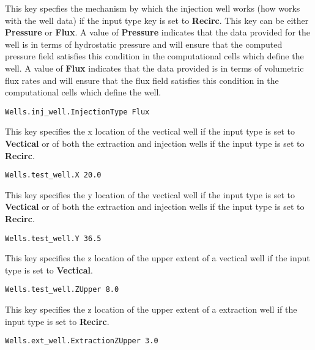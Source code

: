 {
This key specfies the mechanism by which the injection well works (how
\parflow{} works with the well data) if the input type key is set to
{\bf Recirc}.  This key can be either {\bf Pressure} or {\bf Flux}.  A
value of {\bf Pressure} indicates that the data provided for the well is
in terms of hydrostatic pressure and \parflow{} will ensure that the
computed pressure field satisfies this condition in the computational
cells which define the well.  A value of {\bf Flux} indicates that the
data provided is in terms of volumetric flux rates and \parflow{} will
ensure that the flux field satisfies this condition in the computational
cells which define the well.
}
\begin{display}\begin{verbatim}
Wells.inj_well.InjectionType Flux
\end{verbatim}\end{display}

{
This key specifies the x location of the vectical well if the input
type is set to {\bf Vectical} or of both the extraction and injection
wells if the input type is set to {\bf Recirc}.
}
\begin{display}\begin{verbatim}
Wells.test_well.X 20.0
\end{verbatim}\end{display}

{
This key specifies the y location of the vectical well if the input
type is set to {\bf Vectical} or of both the extraction and injection
wells if the input type is set  to {\bf Recirc}.
}
\begin{display}\begin{verbatim}
Wells.test_well.Y 36.5
\end{verbatim}\end{display}

{
This key specifies the z location of the upper extent of a vectical well
if the input type is set to {\bf Vectical}.
}
\begin{display}\begin{verbatim}
Wells.test_well.ZUpper 8.0
\end{verbatim}\end{display}

{
This key specifies the z location of the upper extent of a extraction
well if the input type is set to {\bf Recirc}.
}
\begin{display}\begin{verbatim}
Wells.ext_well.ExtractionZUpper 3.0
\end{verbatim}\end{display}


